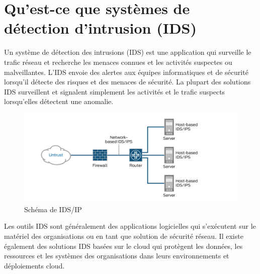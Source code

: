 \documentclass[a4paper,12pt]{report}
\begin{document}
\section{Qu'est-ce que systèmes de détection d’intrusion (IDS)}
\noindent \normalsize Un système de détection des intrusions (IDS) \cite{axelsson2000intrusion} est une application qui surveille le trafic réseau et recherche les menaces connues et les activités suspectes ou malveillantes. L’IDS envoie des alertes aux équipes informatiques et de sécurité lorsqu’il détecte des risques et des menaces de sécurité.
\normalsize La plupart des solutions IDS surveillent et signalent simplement les activités et le trafic suspects lorsqu’elles détectent une anomalie.\\[0.5cm]
\begin{figure}[H]
\centering
 \includegraphics[scale=0.9]{outils-images/ids_schem.jpg}
\caption{Schéma de IDS/IP}
\end{figure}
\normalsize \noindent Les outils IDS sont généralement des applications logicielles qui s’exécutent sur le matériel des organisations ou en tant que solution de sécurité réseau. Il existe également des solutions IDS basées sur le cloud qui protègent les données, les ressources et les systèmes des organisations dans leurs environnements et déploiements cloud.
\end{document}
